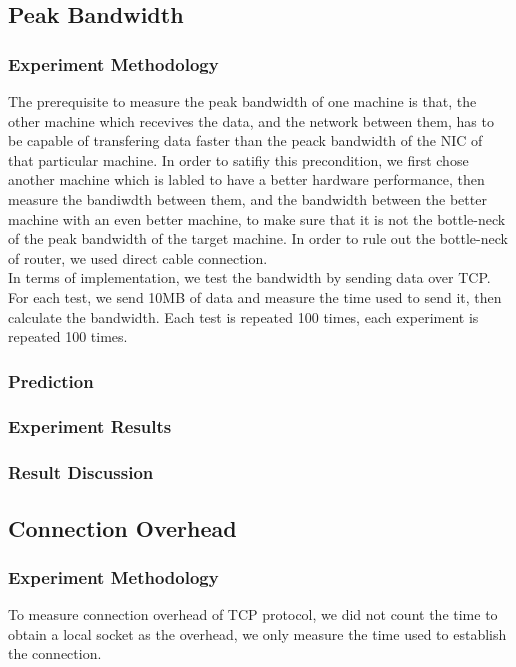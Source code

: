 \documentclass{article} %
\begin{document}
\subsection{Peak Bandwidth}
\subsubsection{Experiment Methodology}
The prerequisite to measure the peak bandwidth of one machine is that, the other machine which recevives the data, and the network between them, has to be capable of transfering data faster than the peack bandwidth of the NIC of that particular machine. In order to satifiy this precondition, we first chose another machine which is labled to have a better hardware performance, then measure the bandiwdth between them, and the bandwidth between the better machine with an even better machine, to make sure that it is not the bottle-neck of the peak bandwidth of the target machine. In order to rule out the bottle-neck of router, we used direct cable connection.\\
In terms of implementation, we test the bandwidth by sending data over TCP. For each test, we send 10MB of data and measure the time used to send it, then calculate the bandwidth. Each test is repeated 100 times, each experiment is repeated 100 times.\\
\subsubsection{Prediction}
\subsubsection{Experiment Results}
\subsubsection{Result Discussion}

\subsection{Connection Overhead}
\subsubsection{Experiment Methodology}
To measure connection overhead of TCP protocol, we did not count the time to obtain a local socket as the overhead, we only measure the time used to establish the connection.
\end{document}
